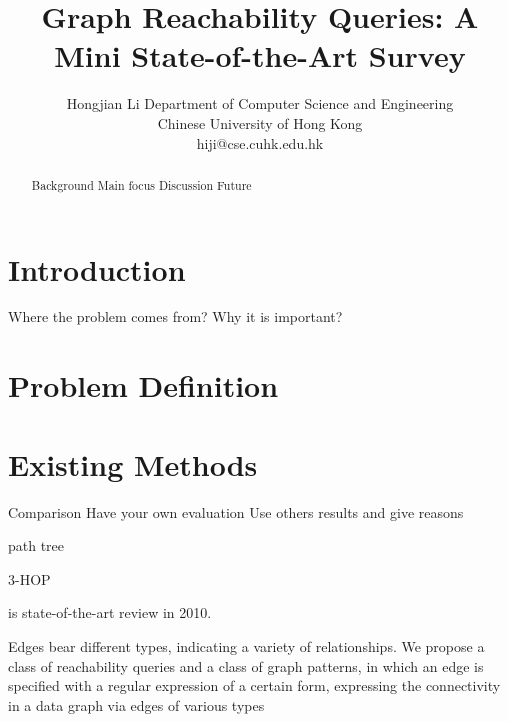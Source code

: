 \documentclass[12pt, conference, compsocconf]{../IEEEtran}
\begin{document}
\title{Graph Reachability Queries: A Mini State-of-the-Art Survey}
\author
{
\IEEEauthorblockN
{
Hongjian Li
\IEEEauthorblockA
{
Department of Computer Science and Engineering\\
Chinese University of Hong Kong\\
hiji@cse.cuhk.edu.hk
}
}
}
\maketitle

\begin{abstract}

Background
Main focus
Discussion
Future

\end{abstract}




\section{Introduction}

Where the problem comes from?
Why it is important?

\section{Problem Definition}



\section{Existing Methods}

Comparison
Have your own evaluation
Use others results and give reasons

\citep{1066} path tree

\citep{1067} 3-HOP

\citep{1063} is state-of-the-art review in 2010.

\citep{1052} Edges bear different types, indicating a variety of relationships. We propose a class of reachability queries and a class of graph patterns, in which an edge is specified with a regular expression of a certain form, expressing the connectivity in a data graph via edges of various types
\end{document}
